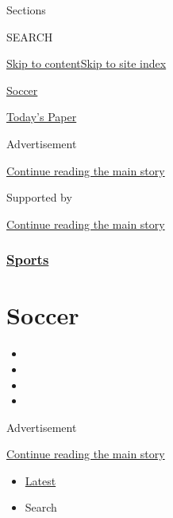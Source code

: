 Sections

SEARCH

\protect\hyperlink{site-content}{Skip to
content}\protect\hyperlink{site-index}{Skip to site index}

\href{https://www.nytimes3xbfgragh.onion/section/sports/soccer}{Soccer}

\href{https://myaccount.nytimes3xbfgragh.onion/auth/login?response_type=cookie\&client_id=vi}{}

\href{https://www.nytimes3xbfgragh.onion/section/todayspaper}{Today's
Paper}

Advertisement

\protect\hyperlink{after-top}{Continue reading the main story}

Supported by

\protect\hyperlink{after-sponsor}{Continue reading the main story}

\hypertarget{sports}{%
\subsubsection{\texorpdfstring{\href{/section/sports}{Sports}}{Sports}}\label{sports}}

\hypertarget{soccer}{%
\section{Soccer}\label{soccer}}

\begin{itemize}
\item
\item
\item
\item
\end{itemize}

Advertisement

\protect\hyperlink{after-subheader}{Continue reading the main story}

\begin{itemize}
\tightlist
\item
  \protect\hyperlink{stream-panel}{Latest}
\item
  Search
\end{itemize}


